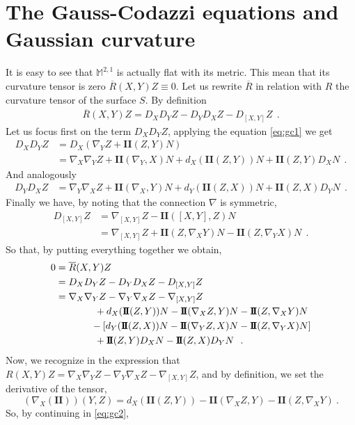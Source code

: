 \documentclass[a4paper,11pt,openright,twoside]{book}
\newcommand{\numunderarrow}[2]{%
	\tikz[baseline=(X.base)]{
		\node[inner sep=0pt] (X) {$#2$};
		\coordinate (M) at ($([yshift=-1.3ex]X.south west)!0.5!([yshift=-1.3ex]X.south east)$);
		\draw[<->] ([yshift=-1.3ex]X.south west) -- ([yshift=-1.3ex]X.south east);
		\StrLen{#1}[\numlen]
			\node[
				draw,
				rounded corners=.7ex,
				fill=white,
				inner xsep=.6ex,
				inner ysep=.2ex
			] at (M) {\scriptsize $#1$};
	}%
}
\newcommand{\M}{\mathbb{M}^{2,1}}
\newcommand{\II}{\mathbf{I\!I}}
\newcommand{\1}{\mathds{1}}
\newcommand{\astr}[1]{\textsf{{(${*}$#1)}}}
\theoremstyle{plain}
\theoremstyle{definition}
\theoremstyle{remark}
\begin{document}
\section{The Gauss-Codazzi equations and Gaussian curvature}
It is easy to see that $\M$ is actually flat with its metric. This mean that its curvature tensor is zero $\overline{R} (X,Y)Z \equiv 0 $.
Let us rewrite $\overline{R}$ in relation with $R$ the curvature tensor of the surface $S$.
By definition
\begin{align*}
	\overline{R}(X,Y) Z = D_X D_Y Z - D_Y D_X Z - D_{[X,Y]}Z
\ \ . 
\end{align*}
Let us focus first on the term $D_X D_Y Z $, applying the equation \eqref{eq:gc1} we get
\begin{align*}
	D_X D_Y Z &= D_X (\nabla_Y Z +\II(Z,Y)N)\\
	&= \nabla_X \nabla_Y Z + \II\left(\nabla_Y,X\right) N + d_X(\II(Z,Y))N + \II(Z,Y)D_XN
\ \ . 
\end{align*}
And analogously
\begin{align*}
	D_Y D_X Z &= \nabla_Y \nabla_X Z + \II\left(\nabla_X,Y\right) N + d_Y(\II(Z,X))N + \II(Z,X)D_YN
\ \ . 
\end{align*}
Finally we have, by noting that the connection $\nabla$ is symmetric,
\begin{align*}
	D_{[X,Y]}Z &= \nabla_{[X,Y]}Z - \II([X,Y],Z)N\\
	&=   \nabla_{[X,Y]}Z + \II(Z,\nabla_X Y)N - \II(Z,\nabla_Y X)N
\ \ . 
\end{align*}
So that, by putting everything together we obtain,
\begin{align}\label{eq:gc2}
	0 &= \overline{R}(X,Y)Z \notag\\
	  &= D_X D_Y Z - D_Y D_X Z- D_{[X,Y]}Z\notag\\ %
	&= \nabla_X \nabla_Y Z - \nabla_Y \nabla_X Z - \nabla_{[X,Y]}Z\notag\\
	& \qquad\qquad+ d_X(\II(Z,Y))N-\II (\nabla_X Z, Y) N -\II(Z,\nabla_X Y)N \notag\\
	& \qquad \hspace{5.75mm}
	-\left[ d_Y(\II(Z,X))N-\II (\nabla_YZ,X)N - \II(Z,\nabla_Y X)N\right]\notag\\
	& \qquad \qquad +\II(Z,Y)D_XN-\II(Z,X)D_YN
\ \ . 
\end{align}
Now, we recognize in the expression that $R(X,Y)Z = \nabla_X \nabla_Y Z - \nabla_Y \nabla_X Z - \nabla_{[X,Y]}Z$, and by definition, we set the derivative of the tensor,\[(\nabla_X(\II))(Y,Z) = d_X(\II(Z,Y))-\II (\nabla_X Z, Y)  -\II(Z,\nabla_X Y)\ .\] So, by continuing in \eqref{eq:gc2},
\end{document}
